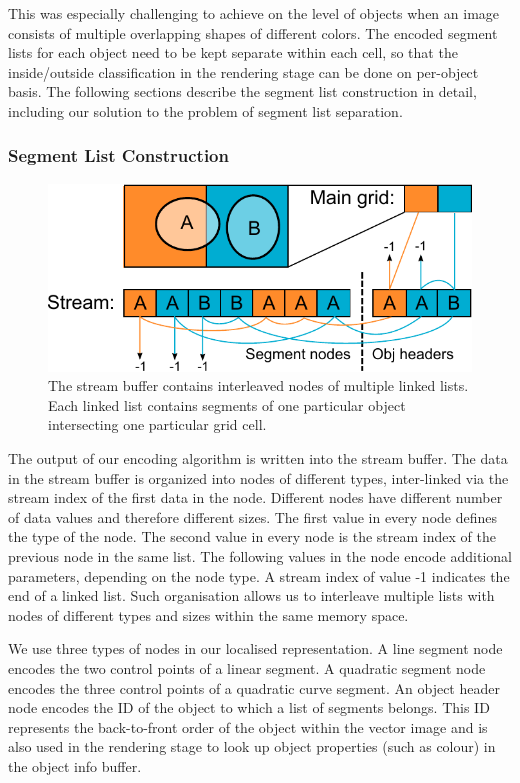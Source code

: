 \documentclass[11pt,a4paper,twoside]{article}
\begin{document}
This was especially challenging to achieve on the level of objects when an image consists of multiple overlapping shapes of different colors. The encoded segment lists for each object need to be kept separate within each cell, so that the inside/outside classification in the rendering stage can be done on per-object basis. The following sections describe the segment list construction in detail, including our solution to the problem of segment list separation.

\subsubsection {Segment List Construction}

\begin {figure} 
	\centering
	\includegraphics[width=0.6\columnwidth] {figures/obj_stream}
	\caption {The stream buffer contains interleaved nodes of multiple linked lists. Each linked list contains segments of one particular object intersecting one particular grid cell.}
	\label {fig:obj_stream}
\end {figure}

The output of our encoding algorithm is written into the stream buffer. The data in the stream buffer is organized into nodes of different types, inter-linked via the stream index of the first data in the node. Different nodes have different number of data values and therefore different sizes. The first value in every node defines the type of the node. The second value in every node is the stream index of the previous node in the same list. The following values in the node encode additional parameters, depending on the node type. A stream index of value -1 indicates the end of a linked list. Such organisation allows us to interleave multiple lists with nodes of different types and sizes within the same memory space.

We use three types of nodes in our localised representation. A line segment node encodes the two control points of a linear segment. A quadratic segment node encodes the three control points of a quadratic curve segment. An object header node encodes the ID of the object to which a list of segments belongs. This ID represents the back-to-front order of the object within the vector image and is also used in the rendering stage to look up object properties (such as colour) in the object info buffer.
\end{document}
